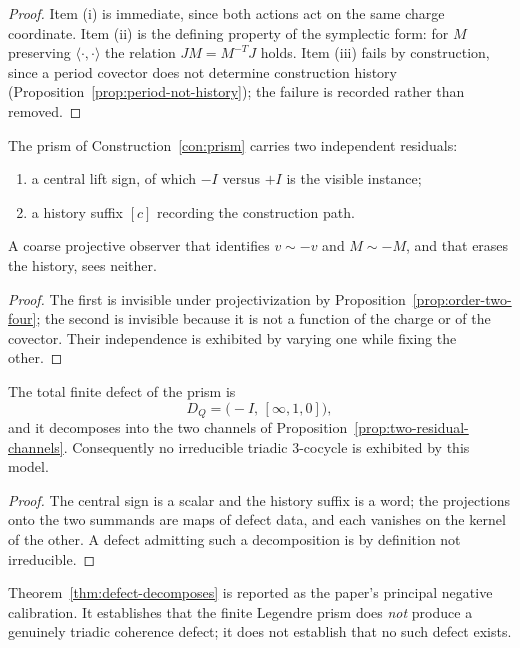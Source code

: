 \begin{proof}
Item (i) is immediate, since both actions act on the same charge coordinate.  Item (ii)
is the defining property of the symplectic form: for $M$ preserving
$\langle\cdot,\cdot\rangle$ the relation $JM=M^{-T}J$ holds.  Item (iii) fails by
construction, since a period covector does not determine construction history
(Proposition~\ref{prop:period-not-history}); the failure is recorded rather than
removed.
\end{proof}

\begin{proposition}\label{prop:two-residual-channels}
The prism of Construction~\ref{con:prism} carries two independent residuals:
\begin{enumerate}
\item a central lift sign, of which $-I$ versus $+I$ is the visible instance;
\item a history suffix $[c]$ recording the construction path.
\end{enumerate}
A coarse projective observer that identifies $v\sim-v$ and $M\sim-M$, and that erases the
history, sees neither.
\end{proposition}

\begin{proof}
The first is invisible under projectivization by
Proposition~\ref{prop:order-two-four}; the second is invisible because it is not a
function of the charge or of the covector.  Their independence is exhibited by varying
one while fixing the other.
\end{proof}

\begin{theorem}\label{thm:defect-decomposes}
The total finite defect of the prism is
\[
  D_Q=\bigl(-I,\,[\infty,1,0]\bigr),
\]
and it decomposes into the two channels of
Proposition~\ref{prop:two-residual-channels}.  Consequently no irreducible triadic
$3$-cocycle is exhibited by this model.
\end{theorem}

\begin{proof}
The central sign is a scalar and the history suffix is a word; the projections onto the
two summands are maps of defect data, and each vanishes on the kernel of the other.  A
defect admitting such a decomposition is by definition not irreducible.
\end{proof}

\begin{calibration}\label{cal:defect-negative}
Theorem~\ref{thm:defect-decomposes} is reported as the paper's principal negative
calibration.  It establishes that the finite Legendre prism does \emph{not} produce a
genuinely triadic coherence defect; it does not establish that no such defect exists.
\end{calibration}

